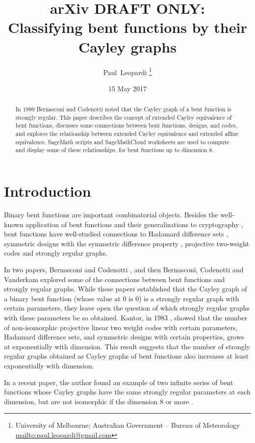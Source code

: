 \documentclass[12pt,a4paper]{article}
\title{arXiv DRAFT ONLY: \\
Classifying bent functions by their Cayley graphs}
\author{
Paul~Leopardi
\thanks{University of Melbourne; Australian Government -- Bureau of Meteorology
\protect\url{mailto:paul.leopardi@gmail.com}}
}
\date{15 May 2017}
\begin{document}
\maketitle

\begin{abstract}
%
In 1999 Bernasconi and Codenotti noted that the Cayley graph of a bent function is strongly regular.
This paper describes the concept of extended Cayley equivalence of bent functions,
discusses some connections between bent functions, designs, and codes,
and explores the relationship between extended Cayley equivalence and extended affine equivalence.
SageMath scripts and Sage\-Math\-Cloud worksheets are used to compute and display some of these relationships,
for bent functions up to dimension 8.
%
\end{abstract}

\section{Introduction}
\label{sec-Introduction}
Binary bent functions are important combinatorial objects.
Besides the well-known application of bent functions and their generalizations to cryptography
\cite{Ada97} \cite[4.1-4.6]{Tok15bent},
bent functions have well-studied connections to Hadamard difference sets \cite{Dil74},
symmetric designs with the symmetric difference property \cite{DilS87block,Kan75symplectic},
projective two-weight codes \cite{DinD15class} and strongly regular graphs.

In two papers, Bernasconi and Codenotti \cite{BerC99}, and then Bernasconi, Codenotti and Vanderkam
\cite{BerCV01} explored some of the connections
between bent functions and strongly regular graphs.
While these papers established that the Cayley graph of a binary bent function (whose value at 0 is
0) is a strongly regular graph
with certain parameters, they leave open the question of which strongly regular graphs with these
parameters  be so obtained.
Kantor, in 1983 \cite{Kan83exponential}, showed that the number of non-isomorphic projective linear
two weight codes with certain parameters,
Hadamard difference sets, and symmetric designs with certain properties, grows at exponentially
with dimension.
This result suggests that the number of strongly regular graphs obtained as Cayley graphs of bent
functions also increases at least exponentially with dimension.

In a recent paper, the author found an example of two infinite series of bent functions whose
Cayley graphs have the same strongly regular parameters at each dimension,
but are not isomorphic if the dimension 8 or more \cite{Leo17Hurwitz}.
\end{document}
